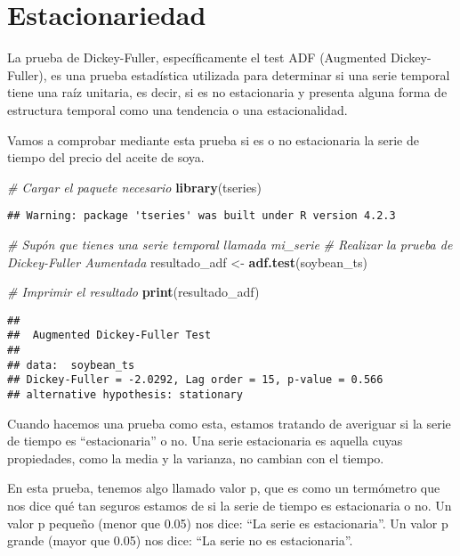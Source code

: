 \documentclass[
]{book}
\newenvironment{Shaded}{\begin{snugshade}}{\end{snugshade}}
\newcommand{\CommentTok}[1]{\textcolor[rgb]{0.56,0.35,0.01}{\textit{#1}}}
\newcommand{\FunctionTok}[1]{\textcolor[rgb]{0.13,0.29,0.53}{\textbf{#1}}}
\newcommand{\NormalTok}[1]{#1}
\newcommand{\OtherTok}[1]{\textcolor[rgb]{0.56,0.35,0.01}{#1}}
\begin{document}
\hypertarget{estacionariedad}{%
\chapter{Estacionariedad}\label{estacionariedad}}

La prueba de Dickey-Fuller, específicamente el test ADF (Augmented Dickey-Fuller), es una prueba estadística utilizada para determinar si una serie temporal tiene una raíz unitaria, es decir, si es no estacionaria y presenta alguna forma de estructura temporal como una tendencia o una estacionalidad.

Vamos a comprobar mediante esta prueba si es o no estacionaria la serie de tiempo del precio del aceite de soya.

\begin{Shaded}
\begin{Highlighting}[]
\CommentTok{\# Cargar el paquete necesario}
\FunctionTok{library}\NormalTok{(tseries)}
\end{Highlighting}
\end{Shaded}

\begin{verbatim}
## Warning: package 'tseries' was built under R version 4.2.3
\end{verbatim}

\begin{Shaded}
\begin{Highlighting}[]
\CommentTok{\# Supón que tienes una serie temporal llamada \textquotesingle{}mi\_serie\textquotesingle{}}
\CommentTok{\# Realizar la prueba de Dickey{-}Fuller Aumentada}
\NormalTok{resultado\_adf }\OtherTok{\textless{}{-}} \FunctionTok{adf.test}\NormalTok{(soybean\_ts)}

\CommentTok{\# Imprimir el resultado}
\FunctionTok{print}\NormalTok{(resultado\_adf)}
\end{Highlighting}
\end{Shaded}

\begin{verbatim}
## 
##  Augmented Dickey-Fuller Test
## 
## data:  soybean_ts
## Dickey-Fuller = -2.0292, Lag order = 15, p-value = 0.566
## alternative hypothesis: stationary
\end{verbatim}

Cuando hacemos una prueba como esta, estamos tratando de averiguar si la serie de tiempo es ``estacionaria'' o no. Una serie estacionaria es aquella cuyas propiedades, como la media y la varianza, no cambian con el tiempo.

En esta prueba, tenemos algo llamado valor p, que es como un termómetro que nos dice qué tan seguros estamos de si la serie de tiempo es estacionaria o no. Un valor p pequeño (menor que 0.05) nos dice: ``La serie es estacionaria''. Un valor p grande (mayor que 0.05) nos dice: ``La serie no es estacionaria''.
\end{document}
